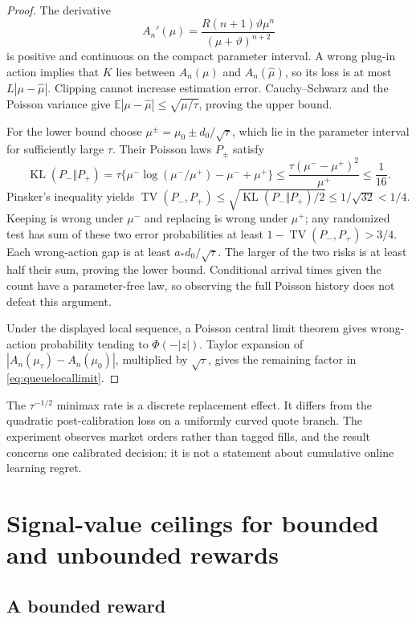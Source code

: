 \documentclass[11pt]{article}
\theoremstyle{plain}
\theoremstyle{definition}
\theoremstyle{remark}
\newcommand{\E}{\mathbb E}
\DeclareMathOperator{\TV}{TV}
\DeclareMathOperator{\KL}{KL}
\begin{document}
\begin{proof}
The derivative
\[
 A_n'(\mu)=
 \frac{R(n+1)\vartheta\mu^n}{(\mu+\vartheta)^{n+2}}
\]
is positive and continuous on the compact parameter interval.
A wrong plug-in action implies that \(K\) lies between
\(A_n(\mu)\) and \(A_n(\widehat\mu)\), so its loss is at most
\(L|\mu-\widehat\mu|\). Clipping cannot increase estimation error.
Cauchy--Schwarz and the Poisson variance give
\(\E|\mu-\widehat\mu|\le\sqrt{\mu/\tau}\), proving the upper bound.

For the lower bound choose
\(\mu^{\pm}=\mu_0\pm d_0/\sqrt{\tau}\), which lie in the
parameter interval for sufficiently large \(\tau\). Their Poisson
laws \(P_\pm\) satisfy
\[
 \KL(P_-\Vert P_+)
 =\tau\{\mu^-\log(\mu^-/\mu^+)-\mu^-+\mu^+\}
 \le\frac{\tau(\mu^--\mu^+)^2}{\mu^+}\le\frac1{16}.
\]
Pinsker's inequality yields
\(\TV(P_-,P_+)\le\sqrt{\KL(P_-\Vert P_+)/2}\le1/\sqrt{32}<1/4\).
Keeping is wrong under \(\mu^-\) and replacing is wrong under
\(\mu^+\); any randomized test has sum of these two error
probabilities at least \(1-\TV(P_-,P_+)>3/4\).
Each wrong-action gap is at least \(a_*d_0/\sqrt{\tau}\).
The larger of the two risks is at least half their sum, proving
the lower bound. Conditional arrival times given the count have
a parameter-free law, so observing the full Poisson history does
not defeat this argument.

Under the displayed local sequence, a Poisson central limit
theorem gives wrong-action probability tending to
\(\Phi(-|z|)\). Taylor expansion of
\(|A_n(\mu_\tau)-A_n(\mu_0)|\), multiplied by \(\sqrt{\tau}\),
gives the remaining factor in \eqref{eq:queuelocallimit}.
\end{proof}

The \(\tau^{-1/2}\) minimax rate is a discrete replacement effect.
It differs from the quadratic post-calibration loss on a uniformly
curved quote branch. The experiment observes market orders rather
than tagged fills, and the result concerns one calibrated decision;
it is not a statement about cumulative online learning regret.


\section{Signal-value ceilings for bounded and unbounded rewards}

\subsection{A bounded reward}
\end{document}

